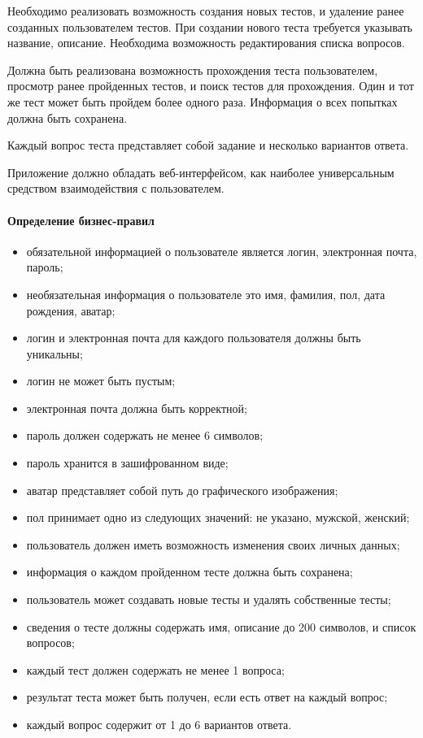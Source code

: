 Необходимо реализовать возможность создания новых тестов, и удаление ранее созданных пользователем тестов. При создании нового теста требуется указывать название, описание. Необходима возможность редактирования списка вопросов.

Должна быть реализована возможность прохождения теста пользователем, просмотр ранее пройденных тестов, и поиск тестов для прохождения. Один и тот же тест может быть пройдем более одного раза. Информация о всех попытках должна быть сохранена.

Каждый вопрос теста представляет собой задание и несколько вариантов ответа.

Приложение должно обладать веб-интерфейсом, как наиболее универсальным средством взаимодействия с пользователем. 

\paragraph{Определение бизнес-правил }

\begin{itemize}
	\item обязательной информацией о пользователе является логин, электронная почта, пароль;
	\item необязательная информация о пользователе это имя, фамилия, пол, дата рождения, аватар;
	\item логин и электронная почта для каждого пользователя должны быть уникальны;
	\item логин не может быть пустым;
	\item электронная почта должна быть корректной;
	\item пароль должен содержать не менее 6 символов;
	\item пароль хранится в зашифрованном виде;
	\item аватар представляет собой путь до графического изображения;
	\item пол принимает одно из следующих значений: не указано, мужской, женский;
	\item пользователь должен иметь возможность изменения своих личных данных;
	\item информация о каждом пройденном тесте должна быть сохранена;
	\item пользователь может создавать новые тесты и удалять собственные тесты;
	\item сведения о тесте должны содержать имя, описание до 200 символов, и список вопросов;
	\item каждый тест должен содержать не менее 1 вопроса;
	\item результат теста может быть получен, если есть ответ на каждый вопрос;
	\item каждый вопрос содержит от 1 до 6 вариантов ответа.
\end{itemize}